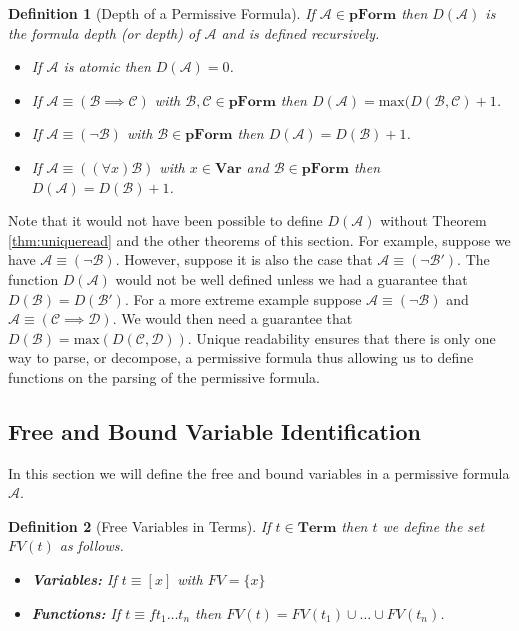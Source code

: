 \documentclass[12pt]{article}
\theoremstyle{break}
\newtheorem{definition}{Definition}[section]
\theoremstyle{break}
\theoremstyle{break}
\theoremstyle{break}
\newcommand{\mc}[1]{\mathcal{#1}}
\begin{document}
\begin{definition}[Depth of a Permissive Formula]
If $\mc{A}\in\textbf{pForm}$ then $D(\mc{A})$ is the formula depth (or depth) of $\mc{A}$ and is defined recursively.
\begin{itemize}
\item{If $\mc{A}$ is atomic then $D(\mc{A}) = 0$.}
\item{If $\mc{A} \equiv (\mc{B} \implies \mc{C})$ with $\mc{B}, \mc{C} \in \textbf{pForm}$ then $D(\mc{A}) = \text{max}(D(\mc{B}, \mc{C}) + 1$.}
\item{If $\mc{A} \equiv (\lnot \mc{B})$ with $\mc{B}\in\textbf{pForm}$ then $D(\mc{A}) = D(\mc{B}) + 1$.}
\item{If $\mc{A} \equiv ((\forall x) \mc{B})$ with $x\in\textbf{Var}$ and $\mc{B} \in \textbf{pForm}$ then $D(\mc{A}) = D(\mc{B}) + 1$.}
\end{itemize}
\end{definition}

Note that it would not have been possible to define $D(\mc{A})$ without Theorem \ref{thm:uniqueread} and the other theorems of this section.
For example, suppose we have $\mc{A} \equiv (\lnot \mc{B})$. 
However, suppose it is also the case that $\mc{A} \equiv (\lnot \mc{B}')$. 
The function $D(\mc{A})$ would not be well defined unless we had a guarantee that $D(\mc{B}) = D(\mc{B}')$.
For a more extreme example suppose $\mc{A} \equiv (\lnot \mc{B})$ and $\mc{A} \equiv (\mc{C} \implies \mc{D})$.
We would then need a guarantee that $D(\mc{B}) = \text{max}(D(\mc{C}, \mc{D}))$.
Unique readability ensures that there is only one way to parse, or decompose, a permissive formula thus allowing us to define functions on the parsing of the permissive formula.

\subsection{Free and Bound Variable Identification}

In this section we will define the free and bound variables in a permissive formula $\mc{A}$.


\begin{definition}[Free Variables in Terms]
If $t\in \textbf{Term}$ then $t$ we define the set $FV(t)$ as follows.
\begin{itemize}
\item{\textbf{Variables:} If $t\equiv [x]$ with $FV = \{x\}$}
\item{\textbf{Functions:} If $t\equiv ft_1\ldots t_n$ then $FV(t) = FV(t_1)\cup\ldots \cup FV(t_n)$.}
\end{itemize}
\end{definition}
\end{document}
